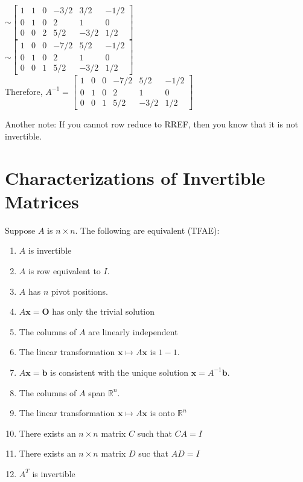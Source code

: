 \documentclass{report}
\begin{document}
\begin{example}
$\sim\begin{bmatrix}
	1 & 1 & 0 & -3/2 & 3/2 & -1/2 \\
	0 & 1 & 0 & 2 & 1 & 0 \\
	0 & 0 & 2 & 5/2 & -3/2 & 1/2 
\end{bmatrix}$\\\vspace{2mm}
$\sim\begin{bmatrix}
	1 & 0 & 0 & -7/2 & 5/2 & -1/2 \\
	0 & 1 & 0 & 2 & 1 & 0 \\
	0 & 0 & 1 & 5/2 & -3/2 & 1/2 
\end{bmatrix}$\\\vspace{2mm}
Therefore, $A^{-1}=\begin{bmatrix}
	1 & 0 & 0 & -7/2 & 5/2 & -1/2 \\
	0 & 1 & 0 & 2 & 1 & 0 \\
	0 & 0 & 1 & 5/2 & -3/2 & 1/2 
\end{bmatrix}$
\end{example}

Another note: If you cannot row reduce to RREF, then you know that it is not invertible.
\section{Characterizations of Invertible Matrices}

\begin{theorem}
Suppose $A$ is $n\times n$. The following are equivalent (TFAE):
\begin{enumerate}
	\item $A$ is invertible
	\item $A$ is row equivalent to $I$.
	\item $A$ has $n$ pivot positions.
	\item $A\mathbf{x}=\mathbf{O}$ has only the trivial solution
	\item The columns of $A$ are linearly independent
	\item The linear transformation $\mathbf{x}\mapsto A\mathbf{x}$ is $1-1$.
	\item $A\mathbf{x}=\mathbf{b}$ is consistent with the unique solution $\mathbf{x}=A^{-1}\mathbf{b}$.
	\item The columns of $A$ span $\mathbb{R}^n$.
	\item The linear transformation $\mathbf{x}\mapsto A\mathbf{x}$ is onto $\mathbb{R}^n$
	\item There exists an $n\times n$ matrix $C$ such that $CA=I$
	\item There exists an $n\times n$ matrix $D$ suc that $AD=I$
	\item $A^T$ is invertible
\end{enumerate}
\end{theorem}
\end{document}
